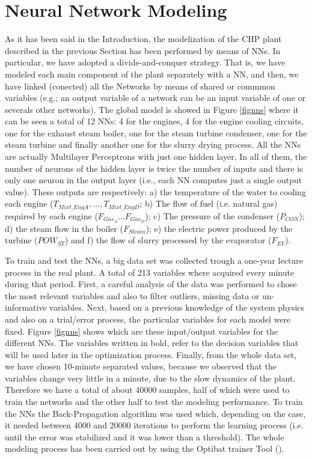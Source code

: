 \section{Neural Network Modeling}
\label{NN}

As it has been said in the Introduction, the modelization of the CHP plant described in the previous Section has been performed by means of  NNs. In particular, we have adopted a divide-and-conquer strategy. That is, we have modeled each main component of the plant separately with a NN, and then, we have linked (conected) all the Networks by means of shared or commmon variables (e.g.; an output variable of a network can be an input variable of one or severals other networks). The global model is showed in Figure \ref{fignns} where it can be seen a total of 12 NNs: 4 for the engines, 4 for the engine cooling  circuits, one for the exhaust steam boiler, one for the steam turbine condenser, one for the steam turbine and finally another one for the slurry drying process. All the NNs are actually Multilayer Perceptrons with just one hidden layer. In all of them, the number of neurons of the hidden layer is twice the number of inputs and there is only one neuron in the output layer (i.e., each NN computes just a single output value). These outputs are respectively: a) the temperature of the water to cooling each engine ($T_{Mixt\_EngA}, \dots, T_{Mixt\_EngD}$; b) The flow of fuel (i.e. natural gas) required by each engine ($F_{Gas_A} \dots F_{Gas_D}$); c) The pressure of the condenser ($P_{CON}$); d) the steam flow in the boiler ($F_{Steam}$); e) the electric power produced by the turbine ($POW_{ST}$) and f) the flow of slurry processed by the evaporator ($F_{EV}$). 

To train and test the NNs, a big data set was collected trough a one-year lecture process in the real plant. A total of  213 variables where acquired every minute during that period. First, a careful analysis of the data was performed to chose the most relevant variables and also to filter outliers, missing data or un-informative variables. Next, based on a previous knowledge of the system physics and also on a trial/error process, the particular variables for each model were fixed. Figure \ref{fignns} shows which are these input/output variables for the different NNs. The variables written in bold, refer to the decision variables that will be used later in the optimization process. Finally, from the whole data set, we have chosen 10-minute separated values, because we observed that the variables change very little in a minute, due to the slow dynamics of the plant. Therefore we have a total of about \num{40000} samples, half of which were used to train the networks and the other half to test the modeling performance. To train the NNs the Back-Propagation algorithm was used which, depending on the case, it needed between \num{4000} and \num{20000} iterations to perform the learning process (i.e. until the error was stabilized and it was lower than a threshold). The whole modeling process has been carried out by using the Optibat trainer Tool (\cite{Optibat}).

